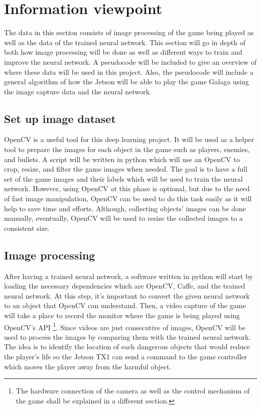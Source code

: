 \documentclass{scrreprt}
\begin{document}
\section{Information viewpoint}%

The data in this section consists of image processing of the game being played as well as the data of the trained neural network.
This section will go in depth of both how image processing will be done as well as different ways to train and improve the neural network.
A pseudocode will be included to give an overview of where these data will be used in this project.
Also, the pseudocode will include a general algorithm of how the Jetson will be able to play the game Galaga using the image capture data and the neural network.

\subsection{Set up image dataset}%

OpenCV is a useful tool for this deep learning project.
It will be used as a helper tool to prepare the images for each object in the game such as players, enemies, and bullets.
A script will be written in python which will use an OpenCV to crop, resize, and filter the game images when needed.
The goal is to have a full set of the game images and their labels which will be used to train the neural network.
However, using OpenCV at this phase is optional, but due to the need of fast image manipulation, OpenCV can be used to do this task easily as it will help to save time and efforts.
Although, collecting objects’ images can be done manually, eventually, OpenCV will be used to resize the collected images to a consistent size.

\subsection{Image processing}%

After having a trained neural network, a software written in python will start by loading the necessary dependencies which are OpenCV, Caffe, and the trained neural network.
At this step, it’s important to convert the given neural network to an object that OpenCV can understand.
Then, a video capture of the game will take a place to record the monitor where the game is being played using OpenCV's API
\footnote{The hardware connection of the camera as well as the control mechanism of the game shall be explained in a different section.}.
Since videos are just consecutive of images, OpenCV will be used to process the images by comparing them with the trained neural network.
The idea is to identify the location of each dangerous objects that would reduce the player's life so the Jetson TX1 can send a command to the game controller which moves the player away from the harmful object.
\end{document}
